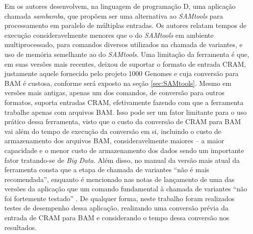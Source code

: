 \documentclass[cic,tc]{iiufrgs}
\begin{document}
Em \cite{tarasov2015sambamba} os autores desenvolvem, na linguagem de
programação D, uma aplicação chamada \textit{sambamba}, que propõem ser uma alternativa
ao \textit{SAMtools} para processamento em paralelo de múltiplas entradas. Os autores
relatam tempos de execução consideravelmente menores que o do \textit{SAMtools} em
ambiente multiprocessado, para comandos diversos utilizados na chamada de
variantes, e uso de memória semelhante ao do \textit{SAMtools}. Uma limitação da
ferramenta é que, em suas versões mais recentes, deixou de suportar o formato
de entrada CRAM, justamente aquele fornecido pelo projeto 1000 Genomes e cuja
conversão para BAM é custosa, conforme será exposto na seção
\ref{sec:SAMtools}. Mesmo em versões mais antigas, apenas um dos comandos, de
conversão para outros formatos, suporta entradas CRAM, efetivamente fazendo com
que a ferramenta trabalhe apenas com arquivos BAM. Isso pode ser um fator
limitante para o uso prático dessa ferramenta, visto que o custo da conversão
de CRAM para BAM vai além do tempo de execução da conversão em si, incluindo o
custo de armazenamento dos arquivos BAM, consideravelmente maiores -- a maior
capacidade e o menor custo de armazenamento dos dados sendo um importante fator
tratando-se de \textit{Big Data}. Além disso, no manual da versão mais atual da
ferramenta consta que a etapa de chamada de variantes ``não é mais
recomendada'', enquanto é mencionado nas notas de lançamento de uma das versões
da aplicação que um comando fundamental à chamada de variantes ``não foi
fortemente testado'' \cite{manual2015sambamba}. De qualquer forma, neste
trabalho foram realizados testes de desempenho dessa aplicação, realizando uma
conversão prévia da entrada de CRAM para BAM e considerando o tempo dessa
conversão nos resultados.
\end{document}
